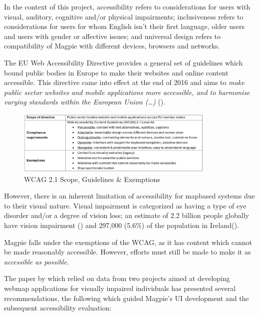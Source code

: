 In the context of this project, accessibility refers to considerations for users
with visual, auditory, cognitive and/or physical impairments; inclusiveness
refers to considerations for users for whom English isn't their first language,
older users and users with gender or affective issues; and universal design
refers to compatibility of Magpie with different devices, browsers and
networks.

The EU Web Accessibility Directive provides a general set of guidelines which
bound public bodies in Europe to make their websites and online content
accessible. This directive came into effect at the end of 2016 and aims to
\emph{make public sector websites and mobile applications more accessible, and
    to harmonise varying standards within the European Union (\ldots)}
(\cite{webaccessibilitydirective2016}).

\begin{figure}[h!]
    \centering
    \includegraphics[width=0.85\textwidth]{images/wcag-guidelines.png}
    \caption{WCAG 2.1 Scope, Guidelines \& Exemptions}
\end{figure}

However, there is an inherent limitation of accessibility for
map\-based systems due to their visual nature. Visual impairment is categorized
as having a type of eye disorder and/or a degree of vision loss; an estimate of
2.2 billion people globally have vision impairment
(\cite{whoworldreportvision2019}) and 297,000 (5.6\%) of the population in
Ireland(\cite{visionirelandcensus}).

Magpie falls under the exemptions of the WCAG, as it has content which cannot be
made reasonably accessible. However, efforts must still be made to make it as
\emph{accessible as possible}.

The paper by \cite{accessibilitywebmapsrecommendations2017} which relied on data
from two projects aimed at developing web\-map applications for visually
impaired individuals has presented several recommendations, the following which
guided Magpie's UI development and the subsequent accessibility evaluation:

